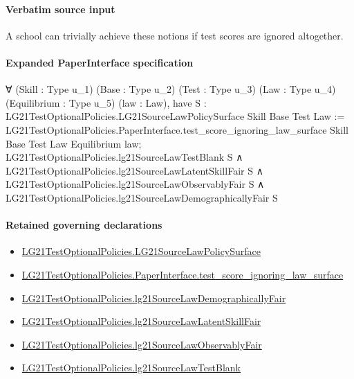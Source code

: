 \documentclass[10pt]{article}
\begin{document}
\paragraph{Verbatim source input}
\begin{ReviewVerbatim}
A school can trivially achieve these notions if test scores are ignored altogether.
\end{ReviewVerbatim}



\paragraph{Expanded PaperInterface specification}
\begin{ReviewVerbatim}
∀ (Skill : Type u_1) (Base : Type u_2) (Test : Type u_3) (Law : Type u_4) (Equilibrium : Type u_5) (law : Law),
  have S : LG21TestOptionalPolicies.LG21SourceLawPolicySurface Skill Base Test Law :=
    LG21TestOptionalPolicies.PaperInterface.test_score_ignoring_law_surface Skill Base Test Law Equilibrium law;
  LG21TestOptionalPolicies.lg21SourceLawTestBlank S ∧
    LG21TestOptionalPolicies.lg21SourceLawLatentSkillFair S ∧
      LG21TestOptionalPolicies.lg21SourceLawObservablyFair S ∧
        LG21TestOptionalPolicies.lg21SourceLawDemographicallyFair S
\end{ReviewVerbatim}

\paragraph{Retained governing declarations}
\begin{itemize}\raggedright
\item \hyperlink{governing-declaration-48965123e52b8b0f}{LG21\allowbreak{}Test\allowbreak{}Optional\allowbreak{}Policies.\allowbreak{}LG21\allowbreak{}Source\allowbreak{}Law\allowbreak{}Policy\allowbreak{}Surface}
\item \hyperlink{governing-declaration-466ed31d421b3b93}{LG21\allowbreak{}Test\allowbreak{}Optional\allowbreak{}Policies.\allowbreak{}Paper\allowbreak{}Interface.\allowbreak{}test\_\allowbreak{}score\_\allowbreak{}ignoring\_\allowbreak{}law\_\allowbreak{}surface}
\item \hyperlink{paper-prerequisite-051c0554c55aebdb}{LG21\allowbreak{}Test\allowbreak{}Optional\allowbreak{}Policies.\allowbreak{}lg21\allowbreak{}Source\allowbreak{}Law\allowbreak{}Demographically\allowbreak{}Fair}
\item \hyperlink{paper-prerequisite-29470906bfc1caef}{LG21\allowbreak{}Test\allowbreak{}Optional\allowbreak{}Policies.\allowbreak{}lg21\allowbreak{}Source\allowbreak{}Law\allowbreak{}Latent\allowbreak{}Skill\allowbreak{}Fair}
\item \hyperlink{paper-prerequisite-a01f7afb43c09d7e}{LG21\allowbreak{}Test\allowbreak{}Optional\allowbreak{}Policies.\allowbreak{}lg21\allowbreak{}Source\allowbreak{}Law\allowbreak{}Observably\allowbreak{}Fair}
\item \hyperlink{paper-prerequisite-986d6a99819fc5ac}{LG21\allowbreak{}Test\allowbreak{}Optional\allowbreak{}Policies.\allowbreak{}lg21\allowbreak{}Source\allowbreak{}Law\allowbreak{}Test\allowbreak{}Blank}
\end{itemize}
\end{document}
